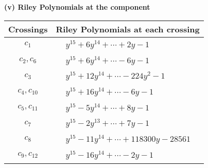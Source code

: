 \documentclass[1p]{elsarticle_modified}
\theoremstyle{definition}
\begin{document}
\newpage\renewcommand{\arraystretch}{1}
\flushleft \textbf{(v) Riley Polynomials at the component}\newline \\
\begin{tabular}{m{50pt}|m{274pt}}
Crossings & \hspace{64pt}Riley Polynomials at each crossing \\
\hline $$\begin{aligned}c_{1}\end{aligned}$$&$\begin{aligned}
&y^{15}+6 y^{14}+\cdots+2 y-1
\end{aligned}$\\
\hline $$\begin{aligned}c_{2},c_{6}\end{aligned}$$&$\begin{aligned}
&y^{15}+6 y^{14}+\cdots-6 y-1
\end{aligned}$\\
\hline $$\begin{aligned}c_{3}\end{aligned}$$&$\begin{aligned}
&y^{15}+12 y^{14}+\cdots-224 y^2-1
\end{aligned}$\\
\hline $$\begin{aligned}c_{4},c_{10}\end{aligned}$$&$\begin{aligned}
&y^{15}+16 y^{14}+\cdots-6 y-1
\end{aligned}$\\
\hline $$\begin{aligned}c_{5},c_{11}\end{aligned}$$&$\begin{aligned}
&y^{15}-5 y^{14}+\cdots+8 y-1
\end{aligned}$\\
\hline $$\begin{aligned}c_{7}\end{aligned}$$&$\begin{aligned}
&y^{15}-2 y^{13}+\cdots+7 y-1
\end{aligned}$\\
\hline $$\begin{aligned}c_{8}\end{aligned}$$&$\begin{aligned}
&y^{15}-11 y^{14}+\cdots+118300 y-28561
\end{aligned}$\\
\hline $$\begin{aligned}c_{9},c_{12}\end{aligned}$$&$\begin{aligned}
&y^{15}-16 y^{14}+\cdots-2 y-1
\end{aligned}$\\
\hline
\end{tabular}\\~\\
\end{document}
